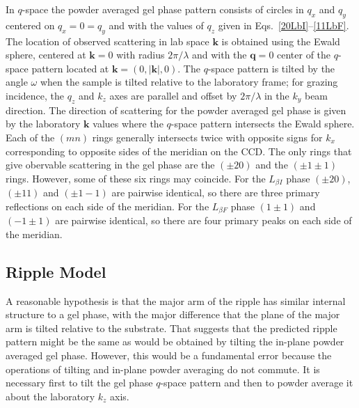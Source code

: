 In $q$-space the powder averaged gel phase pattern consists of circles 
in $q_x$ and $q_y$ centered on $q_x=0=q_y$ and with the values of $q_z$ given 
in Eqs.~\ref{20LbI}--\ref{11LbF}.  
The location of observed scattering in lab space $\mathbf{k}$ is obtained using 
the Ewald sphere, centered at $\mathbf{k}=0$ with radius $2\pi/\lambda$ and with 
the $\mathbf{q}=0$ center of the $q$-space pattern located 
at $\mathbf{k}=(0,|\mathbf{k}|,0)$.  The $q$-space pattern is tilted by the 
angle $\omega$ when the sample is tilted relative to the laboratory frame; for 
grazing incidence, the $q_z$ and $k_z$ axes are parallel and offset 
by $2\pi/\lambda$ in the $k_y$ beam direction.  The direction of scattering for 
the powder averaged gel phase is given by the laboratory $\mathbf{k}$ values 
where the $q$-space pattern intersects the Ewald sphere.  Each of the $(mn)$ 
rings generally intersects twice with opposite signs for $k_x$ corresponding to 
opposite sides of the meridian on the CCD.  The only rings that give obervable 
scattering in the gel phase are the $(\pm20)$ and the $(\pm1\pm1)$ rings.  
However, some of these six rings may coincide. For the $L_{{\beta}I}$ phase 
$(\pm20)$, $(\pm11)$ and $(\pm1-1)$ are pairwise identical, so there are three 
primary reflections on each side of the meridian. For the $L_{{\beta}F}$ phase 
$(1\pm1)$ and $(-1\pm1)$ are pairwise identical, so there are four primary peaks 
on each side of the meridian.

\subsection{Ripple Model}\label{sec:ripple_model}
A reasonable hypothesis is that the major arm of the ripple has similar 
internal structure to a gel phase, with the major   difference that the plane 
of the major arm is tilted relative to the substrate.  That suggests that the 
predicted ripple pattern might be the same as would be obtained by tilting the 
in-plane powder averaged gel phase.  However, this would be a fundamental error 
because the operations of tilting and in-plane powder averaging do not commute.  
It is necessary first to tilt the gel phase $q$-space pattern and then to 
powder average it about the laboratory $k_z$ axis.  

